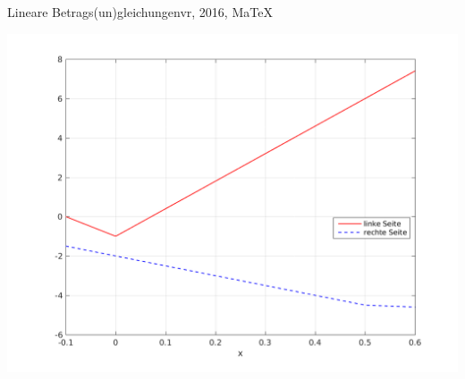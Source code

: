 \begin{MAufgabe}{Lineare Betrags(un)gleichungen}{vr, 2016, MaTeX}
 \begin{center}
 \includegraphics[width=0.8\linewidth]{Abb_zur_Ag_autogenerated_abs_6.png} \end{center}
 
\else\relax\fi
 \end{MAufgabe}